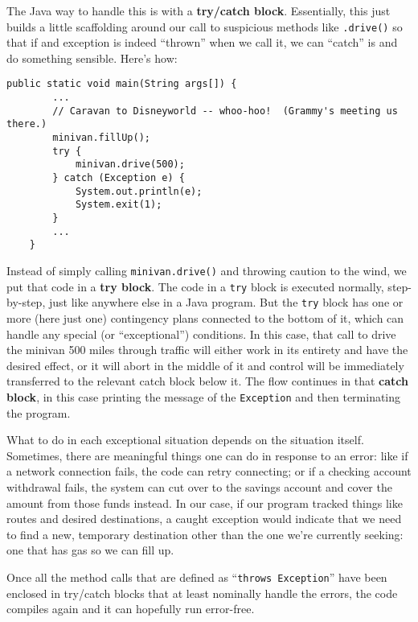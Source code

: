 The Java way to handle this is with a \textbf{try/catch block}. Essentially,
this just builds a little scaffolding around our call to suspicious methods
like \texttt{.drive()} so that if and exception is indeed ``thrown'' when we
call it, we can ``catch'' is and do something sensible. Here's how:

\begin{Verbatim}[samepage=true,fontsize=\scriptsize,frame=single]
    public static void main(String args[]) {
        ...
        // Caravan to Disneyworld -- whoo-hoo!  (Grammy's meeting us there.)
        minivan.fillUp();
        try {
            minivan.drive(500);
        } catch (Exception e) {
            System.out.println(e);
            System.exit(1);
        }
        ...
    }
\end{Verbatim}

Instead of simply calling \texttt{minivan.drive()} and throwing caution to the
wind, we put that code in a \textbf{try block}. The code in a \texttt{try}
block is executed normally, step-by-step, just like anywhere else in a Java
program. But the \texttt{try} block has one or more (here just one)
contingency plans connected to the bottom of it, which can handle any special
(or ``exceptional'') conditions. In this case, that call to drive the minivan
500 miles through traffic will either work in its entirety and have the
desired effect, or it will abort in the middle of it and control will be
immediately transferred to the relevant catch block below it. The flow
continues in that \textbf{catch block}, in this case printing the message of
the \texttt{Exception} and then terminating the program.

What to do in each exceptional situation depends on the situation itself.
Sometimes, there are meaningful things one can do in response to an error:
like if a network connection fails, the code can retry connecting; or if a
checking account withdrawal fails, the system can cut over to the savings
account and cover the amount from those funds instead. In our case, if our
program tracked things like routes and desired destinations, a caught
exception would indicate that we need to find a new, temporary destination
other than the one we're currently seeking: one that has gas so we can fill
up.

Once all the method calls that are defined as ``\texttt{throws Exception}''
have been enclosed in try/catch blocks that at least nominally handle the
errors, the code compiles again and it can hopefully run error-free.

